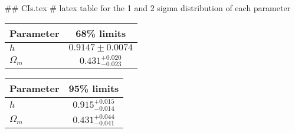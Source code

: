 ## CIs.tex
# latex table for the 1 and 2 sigma distribution of each parameter

\begin{tabular} { l  c}
 Parameter &  68\% limits\\
\hline
{\boldmath$h              $} & $0.9147\pm 0.0074          $\\
{\boldmath$\Omega_m       $} & $0.431^{+0.020}_{-0.023}   $\\
\hline
\end{tabular}

\begin{tabular} { l  c}
 Parameter &  95\% limits\\
\hline
{\boldmath$h              $} & $0.915^{+0.015}_{-0.014}   $\\
{\boldmath$\Omega_m       $} & $0.431^{+0.044}_{-0.041}   $\\
\hline
\end{tabular}
